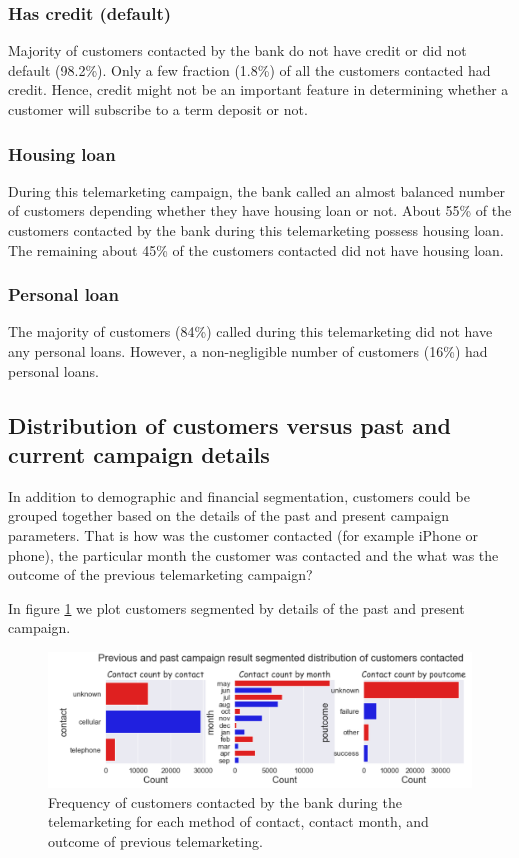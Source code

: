 \subsubsection*{Has credit (default)}
Majority of customers contacted by the bank do not have credit or did not default (98.2\%). Only a few fraction (1.8\%) of all the customers contacted had credit. Hence, credit might not be an important feature in determining whether a customer will subscribe to a term deposit or not. 

\subsubsection*{Housing loan}
During this telemarketing campaign, the bank called an almost balanced number of customers depending whether they have housing loan or not. About 55\% of the customers contacted by the bank during this telemarketing possess housing loan. The remaining about 45\% of the customers contacted did not have housing loan.

\subsubsection*{Personal loan}
The majority of customers (84\%) called during this telemarketing did not have any personal loans. However, a non-negligible number of customers (16\%) had personal loans.

\subsection{Distribution of customers versus past and current campaign details}
In addition to demographic and financial segmentation, customers could be grouped together based on the details of the past and present campaign parameters.  That is how was the customer contacted (for example iPhone or phone), the particular month the customer was contacted and the what was the outcome of the previous telemarketing campaign? 

In figure \ref{fig:cat_campaign_count} we plot customers segmented by details of the past and present campaign.  


\begin{figure}[tbh]
\centering
\includegraphics[width = 1.0\hsize]{./resources/img/fig_cat_campaign_count.png}
\caption{Frequency of customers contacted by the bank during the telemarketing for each method of contact, contact month, and outcome of previous telemarketing.} 
\label{fig:cat_campaign_count}
\end{figure}

